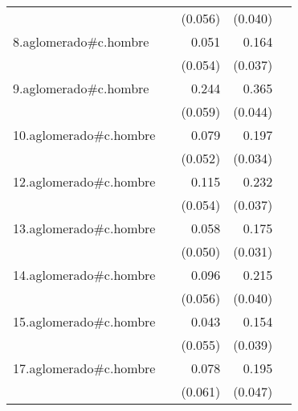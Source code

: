 {\begin{longtable}{l*{4}{D{.}{.}{-1}}}
            &                     &     (0.056)         &     (0.040)         &                     \\
\addlinespace
8.aglomerado#c.hombre&                     &       0.051         &       0.164\sym{***}&                     \\
            &                     &     (0.054)         &     (0.037)         &                     \\
\addlinespace
9.aglomerado#c.hombre&                     &       0.244\sym{***}&       0.365\sym{***}&                     \\
            &                     &     (0.059)         &     (0.044)         &                     \\
\addlinespace
10.aglomerado#c.hombre&                     &       0.079         &       0.197\sym{***}&                     \\
            &                     &     (0.052)         &     (0.034)         &                     \\
\addlinespace
12.aglomerado#c.hombre&                     &       0.115\sym{*}  &       0.232\sym{***}&                     \\
            &                     &     (0.054)         &     (0.037)         &                     \\
\addlinespace
13.aglomerado#c.hombre&                     &       0.058         &       0.175\sym{***}&                     \\
            &                     &     (0.050)         &     (0.031)         &                     \\
\addlinespace
14.aglomerado#c.hombre&                     &       0.096         &       0.215\sym{***}&                     \\
            &                     &     (0.056)         &     (0.040)         &                     \\
\addlinespace
15.aglomerado#c.hombre&                     &       0.043         &       0.154\sym{***}&                     \\
            &                     &     (0.055)         &     (0.039)         &                     \\
\addlinespace
17.aglomerado#c.hombre&                     &       0.078         &       0.195\sym{***}&                     \\
            &                     &     (0.061)         &     (0.047)         &                     \\

\end{longtable}}
